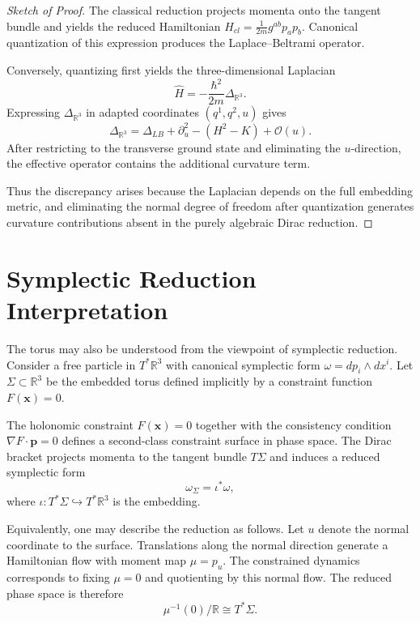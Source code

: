 \documentclass[11pt]{article}
\begin{document}
\begin{proof}[Sketch of Proof]
The classical reduction projects momenta onto the tangent bundle and yields the reduced Hamiltonian $H_{cl} = \frac{1}{2m} g^{ab} p_a p_b$. Canonical quantization of this expression produces the Laplace--Beltrami operator.

Conversely, quantizing first yields the three-dimensional Laplacian
\begin{equation}
\hat H = -\frac{\hbar^2}{2m} \Delta_{\mathbb{R}^3}.
\end{equation}
Expressing $\Delta_{\mathbb{R}^3}$ in adapted coordinates $(q^1,q^2,u)$ gives
\begin{equation}
\Delta_{\mathbb{R}^3} = \Delta_{LB} + \partial_u^2 - (H^2-K) + \mathcal{O}(u).
\end{equation}
After restricting to the transverse ground state and eliminating the $u$-direction, the effective operator contains the additional curvature term.

Thus the discrepancy arises because the Laplacian depends on the full embedding metric, and eliminating the normal degree of freedom after quantization generates curvature contributions absent in the purely algebraic Dirac reduction.
\end{proof}

\section{Symplectic Reduction Interpretation}

The torus may also be understood from the viewpoint of symplectic reduction. Consider a free particle in $T^*\mathbb{R}^3$ with canonical symplectic form $\omega = d p_i \wedge d x^i$. Let $\Sigma \subset \mathbb{R}^3$ be the embedded torus defined implicitly by a constraint function $F(\mathbf{x})=0$.

The holonomic constraint $F(\mathbf{x})=0$ together with the consistency condition $\nabla F \cdot \mathbf{p}=0$ defines a second-class constraint surface in phase space. The Dirac bracket projects momenta to the tangent bundle $T\Sigma$ and induces a reduced symplectic form
\begin{equation}
\omega_{\Sigma} = \iota^* \omega,
\end{equation}
where $\iota: T^*\Sigma \hookrightarrow T^*\mathbb{R}^3$ is the embedding.

Equivalently, one may describe the reduction as follows. Let $u$ denote the normal coordinate to the surface. Translations along the normal direction generate a Hamiltonian flow with moment map $\mu = p_u$. The constrained dynamics corresponds to fixing $\mu=0$ and quotienting by this normal flow. The reduced phase space is therefore
\begin{equation}
\mu^{-1}(0)/\mathbb{R} \cong T^*\Sigma.
\end{equation}
\end{document}
